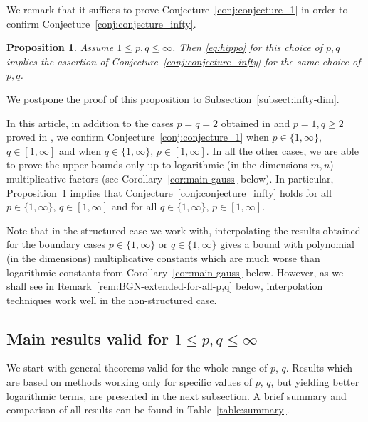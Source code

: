 \documentclass[a4paper]{amsart}
\newtheorem{proposition}[theorem]{Proposition} %
\theoremstyle{definition}
\theoremstyle{remark}
\numberwithin{equation}{section}
\begin{document}
We remark that it suffices to prove Conjecture~\ref{conj:conjecture_1} in order to confirm Conjecture~\ref{conj:conjecture_infty}.
\begin{proposition}	\label{prop:finite-implies-infinite}
	Assume $1\le p, q\le \infty$.
		Then \eqref{eq:hippo} for this choice of $p,q$ implies the assertion of 	 Conjecture~\ref{conj:conjecture_infty}  for the same choice of $p,q$.
\end{proposition}
We postpone the proof of this proposition to Subsection~\ref{subsect:infty-dim}.



In this article,	
in addition to the cases $p=q=2$ obtained in \cite{LvHY} and $p=1, q\ge 2$ proved in \cite{GHLP,Matlak},
we confirm Conjecture~\ref{conj:conjecture_1} when $p\in \{1,\infty\}$, $q\in[1,\infty] $ and when $q\in \{1,\infty\}$, $p\in[1,\infty] $. In all the other cases, we are able to prove the upper bounds only up to logarithmic (in the dimensions $m,n$) multiplicative factors (see Corollary~\ref{cor:main-gauss} below).
In particular, Proposition~\ref{prop:finite-implies-infinite} implies that  Conjecture~\ref{conj:conjecture_infty} holds for all $p\in \{1,\infty\}$, $q\in[1,\infty] $ and for all $q\in \{1,\infty\}$, $p\in[1,\infty] $. 

Note that in the structured case we work with, interpolating the results obtained for the boundary cases $p\in \{1, \infty\}$ or $q\in  \{1, \infty\}$ gives a bound with polynomial (in the dimensions) multiplicative constants which are much worse than logarithmic constants from Corollary~\ref{cor:main-gauss} below. However, as we shall see in Remark~\ref{rem:BGN-extended-for-all-p,q} below, interpolation techniques work well in the non-structured case.



%
\subsection{Main results valid for \texorpdfstring{$1\leq p, q\leq \infty$}{1 leq  p, q leq infty}}
\label{subsect:main-results}
%


We start with general theorems valid for the whole range of $p$, $q$.
Results which are based on methods working only for specific values of $p$, $q$,
but yielding better logarithmic terms, are presented in the next subsection.
A brief summary and comparison of all results can be found in Table~\ref{table:summary}.
\end{document}
